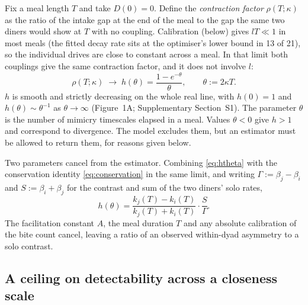 \documentclass[12pt]{article}
\newcommand{\ki}{k_i}
\newcommand{\kj}{k_j}
\begin{document}
Fix a meal length $T$ and take $D(0)=0$. Define the \emph{contraction factor}
$\rho(T;\kappa)$ as the ratio of the intake gap at the end of the meal to the gap
the same two diners would show at $T$ with no coupling. Calibration (below) gives
$lT\ll1$ in most meals (the fitted decay rate sits at the optimiser's lower bound
in 13 of 21), so the individual drives are close to constant across a meal. In
that limit both couplings give the same contraction factor, and it does not
involve $l$:
\begin{equation}\label{eq:htheta}
\rho(T;\kappa)\;\longrightarrow\;h(\theta)=\frac{1-e^{-\theta}}{\theta},
\qquad \theta:=2\kappa T .
\end{equation}
$h$ is smooth and strictly decreasing on the whole real line, with $h(0)=1$ and
$h(\theta)\sim\theta^{-1}$ as $\theta\to\infty$ (Figure~1A; Supplementary
Section~S1). The parameter $\theta$ is the number of mimicry timescales elapsed in
a meal. Values $\theta<0$ give $h>1$ and correspond to divergence. The model
excludes them, but an estimator must be allowed to return them, for reasons
given below.

Two parameters cancel from the estimator. Combining \eqref{eq:htheta} with the
conservation identity \eqref{eq:conservation} in the same limit, and writing
$\Gamma:=\beta_j-\beta_i$ and $S:=\beta_i+\beta_j$ for the contrast and sum of the
two diners' solo rates,
\begin{equation}\label{eq:estimator}
h(\theta)=\frac{\kj(T)-\ki(T)}{\kj(T)+\ki(T)}\cdot\frac{S}{\Gamma}.
\end{equation}
The facilitation constant $A$, the meal duration $T$ and any absolute calibration
of the bite count cancel, leaving a ratio of an observed within-dyad asymmetry to
a solo contrast.

\subsection*{A ceiling on detectability across a closeness scale}
\end{document}
